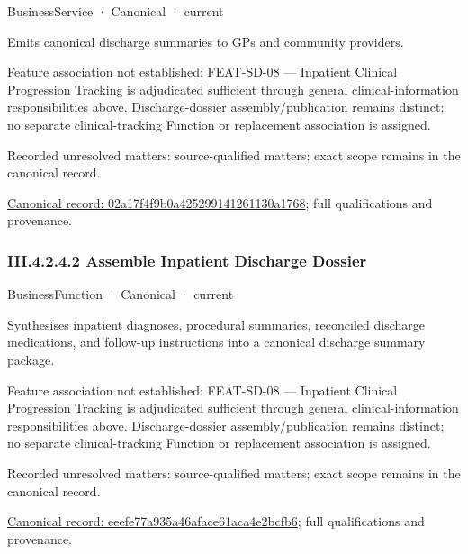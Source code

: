 \label{element:02a17f4f9b0a425299141261130a1768}
{\small BusinessService · Canonical · current}\par

Emits canonical discharge summaries to GPs and community providers.



Feature association not established: FEAT-SD-08 — Inpatient Clinical Progression Tracking is adjudicated sufficient through general clinical-information responsibilities above. Discharge-dossier assembly/publication remains distinct; no separate clinical-tracking Function or replacement association is assigned.


{\small Recorded unresolved matters: source-qualified matters; exact scope remains in the canonical record.}\par
{\footnotesize \href{../../../../../../../../continuum/business/business-service/02a17f4f9b0a425299141261130a1768.md}{Canonical record: 02a17f4f9b0a425299141261130a1768}; full qualifications and provenance.}\par
\subsubsection*{III.4.2.4.2 Assemble Inpatient Discharge Dossier}
\label{navigation:III.4.2.4.2}

\label{element:eeefe77a935a46aface61aca4e2bcfb6}
{\small BusinessFunction · Canonical · current}\par

Synthesises inpatient diagnoses, procedural summaries, reconciled discharge medications, and follow-up instructions into a canonical discharge summary package.



Feature association not established: FEAT-SD-08 — Inpatient Clinical Progression Tracking is adjudicated sufficient through general clinical-information responsibilities above. Discharge-dossier assembly/publication remains distinct; no separate clinical-tracking Function or replacement association is assigned.


{\small Recorded unresolved matters: source-qualified matters; exact scope remains in the canonical record.}\par
{\footnotesize \href{../../../../../../../../continuum/business/business-function/eeefe77a935a46aface61aca4e2bcfb6.md}{Canonical record: eeefe77a935a46aface61aca4e2bcfb6}; full qualifications and provenance.}\par
